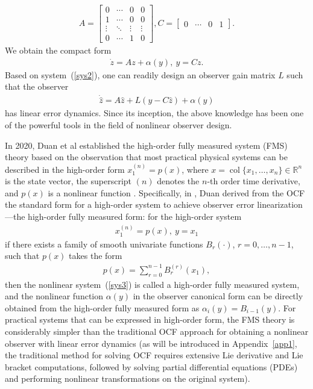 \documentclass[11pt]{article}
\begin{document}
\begin{align}
	A=\begin{bmatrix}0&\cdots&0&0\\
		1&\cdots&0&0\\
		\vdots&\ddots&\vdots&\vdots\\
		0&\cdots&1&0
		\end{bmatrix}, C=\begin{bmatrix}0&\cdots&0&1\end{bmatrix}.
\end{align}
We obtain the compact form
\begin{align}
	\dot{z}=Az+\alpha(y),~y=Cz.\label{sys2}
\end{align}
Based on system~(\ref{sys2}), one can readily design an observer gain matrix $L$ such that the observer
\begin{align}
	\dot{\hat{z}}=A\hat{z}+L(y-C\hat{z})+\alpha(y)
\end{align}
has linear error dynamics. Since its inception, the above knowledge has been one of the powerful tools in the field of nonlinear observer design.

In 2020, Duan et al established the high-order fully measured system (FMS) theory based on the observation that most practical physical systems can be described in the high-order form $x_1^{(n)}=p(x)$, where $x=\operatorname{col}\{x_1,\ldots,x_n\}\in\mathbb{R}^n$ is the state vector, the superscript $(n)$ denotes the $n$-th order time derivative, and $p(x)$ is a nonlinear function \cite{Duan2020III,Duan2024Overview}. Specifically, in \cite{Duan2020III}, Duan derived from the OCF the standard form for a high-order system to achieve observer error linearization---the high-order fully measured form: for the high-order system
\begin{align}
	x_1^{(n)}=p(x),~y=x_1\label{sys3}
\end{align}
if there exists a family of smooth univariate functions $B_r(\cdot)$, $r=0,\ldots,n-1$, such that $p(x)$ takes the form
\begin{align}
	p(x)=\sum_{r=0}^{n-1}B_r^{(r)}(x_1),\label{fms-p}
\end{align}
then the nonlinear system~(\ref{sys3}) is called a high-order fully measured system, and the nonlinear function $\alpha(y)$ in the observer canonical form can be directly obtained from the high-order fully measured form as $\alpha_i(y)=B_{i-1}(y)$. For practical systems that can be expressed in high-order form, the FMS theory is considerably simpler than the traditional OCF approach for obtaining a nonlinear observer with linear error dynamics (as will be introduced in Appendix~\ref{app1}, the traditional method for solving OCF requires extensive Lie derivative and Lie bracket computations, followed by solving partial differential equations (PDEs) and performing nonlinear transformations on the original system).
\end{document}

